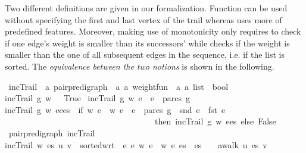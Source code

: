 \begin{isabellebody}
\begin{isamarkuptext}
Two different definitions
are given in our formalization. Function  can be used without specifying the first and last vertex of the trail
whereas  uses more of  predefined features. Moreover, making use of  monotonicity
\mbox{} only requires to check if one edge's weight is smaller than its successors' while 
checks if the weight is smaller than the one of all subsequent edges in the sequence, i.e. if the list 
is sorted. The {\em equivalence
between the two notions} is shown in the following.%
\end{isamarkuptext}\isamarkuptrue%
\isamarkupfalse%
\ incTrail\ {\isacharcolon}{\isacharcolon}\ {\isachardoublequoteopen}{\isacharprime}a\ pair{\isacharunderscore}pre{\isacharunderscore}digraph\ {\isasymRightarrow}\ {\isacharparenleft}{\isacharprime}a\ {\isasymtimes}{\isacharprime}a{\isacharparenright}\ weight{\isacharunderscore}fun\ {\isasymRightarrow}\ {\isacharparenleft}{\isacharprime}a\ {\isasymtimes}{\isacharprime}a{\isacharparenright}\ list\ {\isasymRightarrow}\ bool{\isachardoublequoteclose}\ \isanewline
{\isachardoublequoteopen}incTrail\ g\ w\ {\isacharbrackleft}{\isacharbrackright}\ {\isacharequal}\ True{\isachardoublequoteclose}\ {\isacharbar}\isanewline
{\isachardoublequoteopen}incTrail\ g\ w\ {\isacharbrackleft}e\ {\isacharequal}\ {\isacharparenleft}e\ {\isasymin}\ parcs\ g{\isacharparenright}{\isachardoublequoteclose}\ {\isacharbar}\isanewline
{\isachardoublequoteopen}incTrail\ g\ w\ {\isacharparenleft}eees{\isacharparenright}\ {\isacharequal}\ {\isacharparenleft}if\ w\ e\ {\isacharless}\ w\ e\ {\isasymand}\ e\ {\isasymin}\ parcs\ g\ {\isasymand}\ snd\ e\ {\isacharequal}\ fst\ e\ \isanewline
\ \ \ \ \ \ \ \ \ \ \ \ \ \ \ \ \ \ \ \ \ \ \ \ \ \ \ \ \ \ \ \ \ \ \ \ then\ incTrail\ g\ w\ {\isacharparenleft}ees{\isacharparenright}\ else\ False{\isacharparenright}{\isachardoublequoteclose}\isanewline
\isanewline
{}\isamarkupfalse%
{\isacharparenleft}\ pair{\isacharunderscore}pre{\isacharunderscore}digraph{\isacharparenright}\ incTrail{}\ \ \isanewline
{\isachardoublequoteopen}incTrail{}\ w\ es\ u\ v\ {\isasymequiv}\ sorted{\isacharunderscore}wrt\ {\isacharparenleft}{\isasymlambda}\ e\ e\ w\ e\ {\isacharless}\ w\ e\ es\ {\isasymand}\ {\isacharparenleft}es\ {\isacharequal}\ {\isacharbrackleft}{\isacharbrackright}\ {\isasymor}\ awalk\ u\ es\ v{\isacharparenright}{\isachardoublequoteclose}\isanewline

\end{isabellebody}
